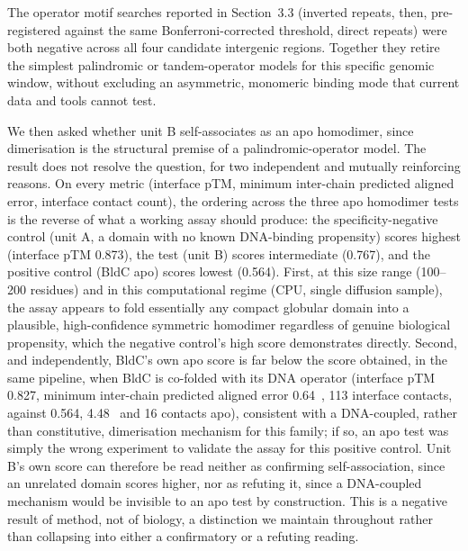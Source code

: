 \documentclass[11pt,a4paper]{article}
\newcommand{\ang}{\text{\AA}}
\begin{document}
The operator motif searches reported in Section~3.3 (inverted repeats, then, pre-registered against
the same Bonferroni-corrected threshold, direct repeats) were both negative across all four
candidate intergenic regions. Together they retire the simplest palindromic or tandem-operator
models for this specific genomic window, without excluding an asymmetric, monomeric binding mode
that current data and tools cannot test.

We then asked whether unit B self-associates as an apo homodimer, since dimerisation is the
structural premise of a palindromic-operator model. The result does not resolve the question, for
two independent and mutually reinforcing reasons. On every metric (interface pTM, minimum
inter-chain predicted aligned error, interface contact count), the ordering across the three apo
homodimer tests is the reverse of what a working assay should produce: the specificity-negative
control (unit A, a domain with no known DNA-binding propensity) scores highest (interface pTM
0.873), the test (unit B) scores intermediate (0.767), and the positive control (BldC apo) scores
lowest (0.564). First, at this size range (100--200 residues) and in this computational regime
(CPU, single diffusion sample), the assay appears to fold essentially any compact globular domain
into a plausible, high-confidence symmetric homodimer regardless of genuine biological propensity,
which the negative control's high score demonstrates directly. Second, and independently, BldC's
own apo score is far below the score obtained, in the same pipeline, when BldC is co-folded with
its DNA operator (interface pTM 0.827, minimum inter-chain predicted aligned error 0.64~\ang{}, 113
interface contacts, against 0.564, 4.48~\ang{} and 16 contacts apo), consistent with a
DNA-coupled, rather than constitutive, dimerisation mechanism for this family; if so, an apo test
was simply the wrong experiment to validate the assay for this positive control. Unit B's own score
can therefore be read neither as confirming self-association, since an unrelated domain scores
higher, nor as refuting it, since a DNA-coupled mechanism would be invisible to an apo test by
construction. This is a negative result of method, not of biology, a distinction we maintain
throughout rather than collapsing into either a confirmatory or a refuting reading.
\end{document}

